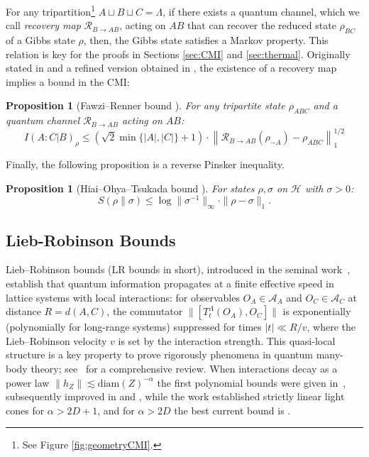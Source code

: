 \documentclass[11pt]{article}
\numberwithin{equation}{section}
\numberwithin{figure}{section}
\numberwithin{table}{section}
\theoremstyle{definition}
\theoremstyle{plain}
\newtheorem{prop}[thm]{Proposition}
\theoremstyle{remark}
\newcommand{\La}{\Lambda}
\newcommand{\T}{T^\Lambda}
\newcommand{\normm}[2]{\left\lVert#1\right\rVert_{#2}}
\newcommand{\abs}[1]{\left \vert#1\right\vert}
\begin{document}
For any tripartition\footnote{See Figure \ref{fig:geometryCMI}.} $A\sqcup B \sqcup C=\La$, if there exists a quantum channel, which we call \textit{recovery map} $\mathcal{R}_{B\to AB}$, acting on $AB$ that can recover the reduced state $\rho_{BC}$ of a Gibbs state $\rho$, then, the Gibbs state satisfies a Markov property. This relation is key for the proofs in Sections \ref{sec:CMI} and \ref{sec:thermal}. Originally stated in \cite[Equation 10]{FawRen15} and a refined version obtained in \cite[Equation 35]{Bluhm_2023}, the existence of a recovery map implies a bound in the CMI:

\medskip 
\begin{prop}[Fawzi--Renner bound {\cite[Equation 35]{Bluhm_2023}}]
\label{prop:FR}
For any tripartite state $\rho_{ABC}$ and a quantum channel 
$\mathcal{R}_{B\to AB}$ acting on $AB$:
\begin{equation}
    I(A:C|B)_\rho \leq (\sqrt{2}\min\{\abs{A},\abs{C}\}+1) \cdot\normm{\mathcal{R}_{B\to AB} (\rho_{-A})-\rho_{ABC}}{1}^{1/2}
    \label{eq:FR}
\end{equation}
\end{prop}
\medskip
Finally, the following proposition is a reverse Pinsker inequality.

\medskip
\begin{prop}[Hiai--Ohya--Tsukada bound {\cite{HOT81}}]
\label{prop:HOT}
For states $\rho, \sigma$ on $\mathcal{H}$ with $\sigma > 0$:
\begin{equation}
    S(\rho\|\sigma) \leq \log\|\sigma^{-1}\|_\infty \cdot \|\rho - \sigma\|_1.
    \label{eq:HOT}
\end{equation}
\end{prop}

\subsection{Lieb-Robinson Bounds}

Lieb--Robinson bounds (LR bounds in short), introduced in the seminal work~\cite{LieRob72}, establish that quantum information propagates at a finite effective speed in lattice systems with local interactions: for observables $O_A\in \mathcal{A}_A$ and $O_C \in \mathcal{A}_C$ at distance $R = d(A,C)$, the commutator $\|[\T_t(O_A), O_C]\|$ is exponentially (polynomially for long-range systems) suppressed for times $|t| \ll R/v$, where the Lieb--Robinson velocity $v$ is set by the interaction strength.   
This quasi-local structure is a key property to prove rigorously phenomena in quantum many-body theory; see~\cite{ChenLucasYin23} for a comprehensive review. 
When interactions decay as a power law $\|h_Z\| \lesssim \mathrm{diam}(Z)^{-\alpha}$ the first polynomial bounds were given in~\cite{hastings_spectral_2006}, subsequently improved in \cite{MatKomNak17} and \cite{else_improved_2020}, while the work \cite{kuwahara_strictly_2020} established strictly linear light cones for $\alpha > 2D+1$, and for $\alpha > 2D$ the best current bound is \cite{Tran_2021}. 
\end{document}
